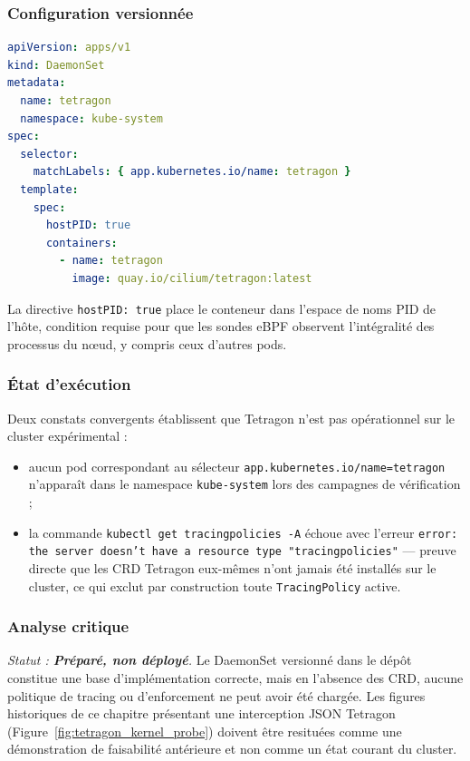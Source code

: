 \subsubsection{Configuration versionnée}
\begin{lstlisting}[language=yaml, caption={Extrait réel du DaemonSet Tetragon (\texttt{infra/k8s/tetragon/daemonset.yaml})}, label={lst:tetragon_daemonset_reel}]
apiVersion: apps/v1
kind: DaemonSet
metadata:
  name: tetragon
  namespace: kube-system
spec:
  selector:
    matchLabels: { app.kubernetes.io/name: tetragon }
  template:
    spec:
      hostPID: true
      containers:
        - name: tetragon
          image: quay.io/cilium/tetragon:latest
\end{lstlisting}

La directive \texttt{hostPID: true} place le conteneur dans l'espace de noms PID de l'hôte, condition requise pour que les sondes eBPF observent l'intégralité des processus du nœud, y compris ceux d'autres pods.

\subsubsection{État d'exécution}
Deux constats convergents établissent que Tetragon n'est pas opérationnel sur le cluster expérimental :
\begin{itemize}
    \item aucun pod correspondant au sélecteur \texttt{app.kubernetes.io/name=tetragon} n'apparaît dans le namespace \texttt{kube-system} lors des campagnes de vérification ;
    \item la commande \texttt{kubectl get tracingpolicies -A} échoue avec l'erreur \texttt{error: the server doesn't have a resource type "tracingpolicies"} — preuve directe que les CRD Tetragon eux-mêmes n'ont jamais été installés sur le cluster, ce qui exclut par construction toute \texttt{TracingPolicy} active.
\end{itemize}

\subsubsection{Analyse critique}
\textit{Statut : \textbf{Préparé, non déployé}.} Le DaemonSet versionné dans le dépôt constitue une base d'implémentation correcte, mais en l'absence des CRD, aucune politique de tracing ou d'enforcement ne peut avoir été chargée. Les figures historiques de ce chapitre présentant une interception JSON Tetragon (Figure~\ref{fig:tetragon_kernel_probe}) doivent être resituées comme une démonstration de faisabilité antérieure et non comme un état courant du cluster.

